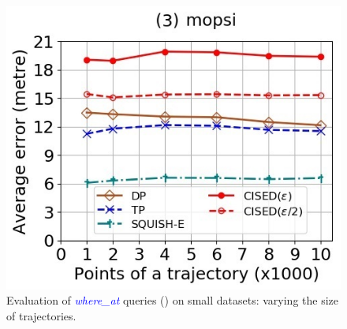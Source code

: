 \begin{figure}[tb!]
	\includegraphics[scale=0.400]{Figures/Exp-where-SED-error-size-mopsi.jpg}		
	\vspace{-2ex}
	\caption{\small Evaluation of \textcolor{blue}{\emph{where\_at}} queries (\sed) on small datasets: varying the size of
		trajectories.}
	\label{fig:query-sed-size}
	\vspace{-1ex}
\end{figure}


